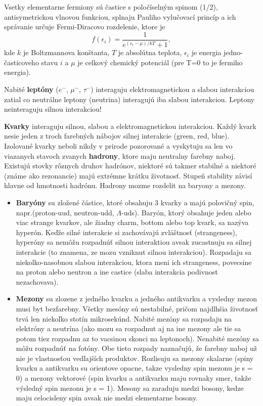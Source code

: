 \documentclass[../../main.tex]{subfiles}
\begin{document}
Vsetky elementarne fermiony sú častice s poločíselným spinom (1/2), antisymetrickou vlnovou funkciou, splnaju Pauliho vylučovací princíp a ich správanie určuje Fermi-Diracovo rozdelenie, ktore je
\begin{equation}
f(\epsilon_i)=\frac{1}{e^{(\epsilon_i-\mu)/kT}+1},
\end{equation}
kde $k$ je Boltzmannova konštanta, $T$ je absolútna teplota, $\epsilon_i$ je energia jedno-časticoveho stavu $i$ a $\mu$ je celkový chemický potenciál (pre T=0 to je fermiho energia).\par
Nabité \textbf{leptóny} ($e^{-}$, $\mu^{-}$, $\tau^{-}$) interaguju elektromagnetickou a slabou interakciou zatial co neutrálne leptony (neutrina) interagujú iba slabou interakciou. Leptony neinteraguju silnou interakciou!\par
\textbf{Kvarky} interaguju silnou, slabou a elektromagnetickou interakciou. Každý kvark nesie jeden z troch farebných nábojov silnej interakcie (green, red, blue). Izolované kvarky neboli nikdy v prirode pozorované a vyskytuju sa len vo viazanych stavoch zvanych \textbf{hadrony}, ktore maju neutralny farebny naboj. Existujú stovky rôznych druhov hadrónov, niektoré sú takmer stabilné a niektoré (známe ako rezonancie) majú extrémne krátku životnosť. Stupeň stability závisí hlavne od hmotnosti hadrónu. Hadrony mozme rozdelit na baryony a mezony. 
\begin{itemize}
\item \textbf{Baryóny} su zložené částice, ktoré obsahuju 3 kvarky a majú polovičný spin, napr.(proton-uud, neutron-udd, $\Lambda$-uds). Baryón, ktorý obsahuje jeden alebo viac strange kvarkov, ale žiadny charm, bottom alebo top kvark, sa nazýva hyperón. Keďže silné interakcie si zachovávajú zvláštnosť (strangeness), hyperóny sa nemôžu rozpadnúť silnou interaktiou avsak zucastnuju sa silnej interakcie (to znamena, ze mozu vzniknut silnou interakciou). Rozpadaju sa niekolko-nasobnou slabou interakciou, ktora meni ich strangeness, povecsine na proton alebo neutron a ine castice (slaba interakcia podivnost nezachovava).
\item \textbf{Mezony} su zlozene z jedného kvarku a jedného antikvarku a vysledny mezon musi byt bezfarebny. Všetky mesóny sú nestabilné, pričom najdlhšia životnosť trvá len niekoľko stotín mikrosekúnd. Nabité mezóny sa rozpadaju na elektróny a neutrína (ako mozu sa rozpadnut aj na ine mezony ale tie sa potom tiez rozpadnu az to vacsinou skonci na leptonoch). Nenabité mezóny sa môžu rozpadnúť na fotóny. Obe tieto rozpady naznačujú, že farebny naboj už nie je vlastnosťou vedľajších produktov. Rozlisuju sa mezony skalarne (spiny kvarku a antikvarku su orientove opacne, takze vysledny spin mezonu je s = 0) a mezony vektorové (spin kvarku a antikvarku maju rovnaky smer, takže výsledný spin mezonu je s = 1). Mesony sa zaraduju medzi bosony, kedze maju celocisleny spin avsak nie medzi elementarne bosony. 
\end{itemize}
\end{document}
